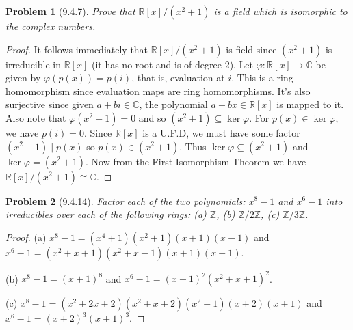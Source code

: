 \documentclass{article}
\newtheorem{problem}{Problem}
\begin{document}
\begin{problem}[9.4.7]
Prove that $\mathbb{R}[x]/(x^2 + 1)$ is a field which is isomorphic to the complex numbers.
\end{problem}
\begin{proof}
It follows immediately that $\mathbb{R}[x]/(x^2 + 1)$ is field since $(x^2 + 1)$ is irreducible in $\mathbb{R}[x]$ (it has no root and is of degree $2$). Let $\varphi : \mathbb{R}[x] \to \mathbb{C}$ be given by $\varphi(p(x)) = p(i)$, that is, evaluation at $i$. This is a ring homomorphism since evaluation maps are ring homomorphisms. It's also surjective since given $a + bi \in \mathbb{C}$, the polynomial $a + bx \in \mathbb{R}[x]$ is mapped to it. Also note that $\varphi(x^2+1) = 0$ and so $(x^2 + 1) \subseteq \ker \varphi$. For $p(x) \in \ker \varphi$, we have $p(i) = 0$. Since $\mathbb{R}[x]$ is a U.F.D, we must have some factor $(x^2 + 1) \mid p(x)$ so $p(x) \in (x^2 + 1)$. Thus $\ker \varphi \subseteq (x^2 + 1)$ and $\ker \varphi = (x^2 + 1)$. Now from the First Isomorphism Theorem we have $\mathbb{R}[x]/(x^2 + 1) \cong \mathbb{C}$.
\end{proof}

\begin{problem}[9.4.14]
Factor each of the two polynomials: $x^8 - 1$ and $x^6 - 1$ into irreducibles over each of the following rings: (a) $\mathbb{Z}$, (b) $\mathbb{Z}/2\mathbb{Z}$, (c) $\mathbb{Z}/3\mathbb{Z}$.
\end{problem}
\begin{proof}
(a) $x^8 - 1 = (x^4 + 1)(x^2 + 1)(x + 1)(x - 1)$ and $x^6 - 1 = (x^2 + x + 1)(x^2 + x -1)(x + 1)(x - 1)$.

(b) $x^8 - 1 = (x+1)^8$ and $x^6 - 1 = (x + 1)^2(x^2 + x + 1)^2$.

(c) $x^8 - 1 = (x^2 + 2x + 2)(x^2 + x + 2)(x^2 + 1)(x + 2)(x + 1)$ and $x^6 - 1 = (x + 2)^3(x + 1)^3$.
\end{proof}
\end{document}
